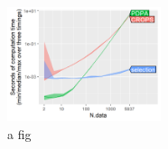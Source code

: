 \documentclass{article}
\begin{document}
\begin{figure}
  \centering
    \includegraphics[width=0.4\textwidth]{figure-crops-compare.png}
  \caption{a fig}
\end{figure}
\end{document}

